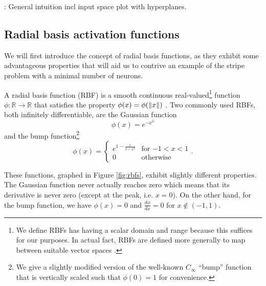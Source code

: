 \todo: General intuition incl input space plot with hyperplanes.

\subsection{Radial basis activation functions}
We will first introduce the concept of radial basis functions, as they exhibit some advantageous properties that will aid us to contrive an example of the stripe problem with a minimal number of neurons.
\begin{definition}
    A radial basis function (RBF) is a smooth continuous real-valued\footnote{We define RBFs has having a scalar domain and range because this suffices for our purposes. In actual fact, RBFs are defined more generally to map between suitable vector spaces \cite{buhmann2000}.} function $\phi : \mathbb{R} \rightarrow \mathbb{R}$ that satisfies the property $\phi(x) = \phi(\left\lVert x\right\rVert)$ \cite{buhmann2000}. 
    Two commonly used RBFs, both infinitely differentiable, are the Gaussian function
    \begin{equation}
        \label{eq:sigmoid}
        \phi(x) = e^{-x^2}
    \end{equation}
    and the bump function\footnote{We give a slightly modified version of the well-known $C_\infty$ ``bump'' function \cite{johnson2015} that is vertically scaled such that $\phi(0)=1$ for convenience.}
    \begin{equation}
        \label{eq:bump}
        \phi(x) = 
        \begin{cases}
            e^{1-\frac{1}{1-x^2}} & \text{for $-1<x<1$} \\
            0 & \text{otherwise}
        \end{cases}.
    \end{equation}
\end{definition}

These functions, graphed in Figure \ref{fig:rbfs}, exhibit slightly different properties.
The Gaussian function never actually reaches zero which means that its derivative is never zero (except at the peak, i.e. $x=0$). 
On the other hand, for the bump function, we have $\phi(x)=0$ and $\frac{d\phi}{dx}=0$ for $x \notin (-1, 1)$.

\begin{lemma}
    
\end{lemma}

